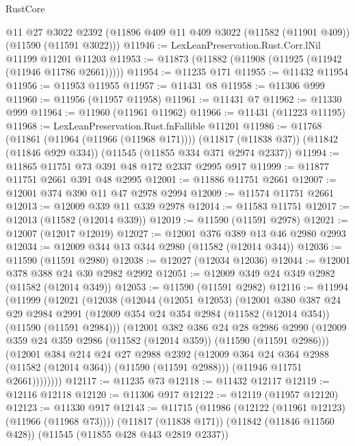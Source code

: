 \begin{lexlean}{RustCore}
\begin{coremodule}
    @11
    @27
    @3022
    @2392
    (@11896 @409 @11 @409 @3022 (@11582 (@11901 @409)) (@11590 (@11591 @3022)))
@11946 := LexLeanPreservation.Rust.Corr.lNil @11199 @11201 @11203
@11953 := @11873 (@11882 (@11908 (@11925 (@11942 (@11946 @11786 @2661)))))
@11954 := @11235 @171
@11955 := @11432 @11954
@11956 := @11953 @11955
@11957 := @11431 @8
@11958 := @11306 @999
@11960 := @11956 (@11957 @11958)
@11961 := @11431 @7
@11962 := @11330 @999
@11964 := @11960 (@11961 @11962)
@11966 := @11431 (@11223 @11195)
@11968 := LexLeanPreservation.Rust.fnFallible @11201
@11986 := @11768
    (@11861 (@11964 (@11966 (@11968 @171))))
    (@11817 (@11838 @37))
    (@11842 (@11846 @929 @334))
    (@11545 (@11855 @334 @371 @2974 @2337))
@11994 := @11865 @11751 @73 @391 @48 @172 @2337 @2995 @917
@11999 := @11877 @11751 @2661 @391 @48 @2995
@12001 := @11886 @11751 @2661
@12007 := @12001 @374 @390 @11 @47 @2978 @2994
@12009 := @11574 @11751 @2661
@12013 := @12009 @339 @11 @339 @2978
@12014 := @11583 @11751
@12017 := @12013 (@11582 (@12014 @339))
@12019 := @11590 (@11591 @2978)
@12021 := @12007 (@12017 @12019)
@12027 := @12001 @376 @389 @13 @46 @2980 @2993
@12034 := @12009 @344 @13 @344 @2980 (@11582 (@12014 @344))
@12036 := @11590 (@11591 @2980)
@12038 := @12027 (@12034 @12036)
@12044 := @12001 @378 @388 @24 @30 @2982 @2992
@12051 := @12009 @349 @24 @349 @2982 (@11582 (@12014 @349))
@12053 := @11590 (@11591 @2982)
@12116 := @11994
    (@11999
      (@12021
        (@12038
          (@12044
            (@12051 @12053)
            (@12001
              @380
              @387
              @24
              @29
              @2984
              @2991
              (@12009 @354 @24 @354 @2984 (@11582 (@12014 @354)) (@11590 (@11591 @2984)))
              (@12001
                @382
                @386
                @24
                @28
                @2986
                @2990
                (@12009 @359 @24 @359 @2986 (@11582 (@12014 @359)) (@11590 (@11591 @2986)))
                (@12001
                  @384
                  @214
                  @24
                  @27
                  @2988
                  @2392
                  (@12009 @364 @24 @364 @2988 (@11582 (@12014 @364)) (@11590 (@11591 @2988)))
                  (@11946 @11751 @2661))))))))
@12117 := @11235 @73
@12118 := @11432 @12117
@12119 := @12116 @12118
@12120 := @11306 @917
@12122 := @12119 (@11957 @12120)
@12123 := @11330 @917
@12143 := @11715
    (@11986 (@12122 (@11961 @12123) (@11966 (@11968 @73))))
    (@11817 (@11838 @171))
    (@11842 (@11846 @11560 @428))
    (@11545 (@11855 @428 @443 @2819 @2337))

\end{coremodule}
\end{lexlean}
